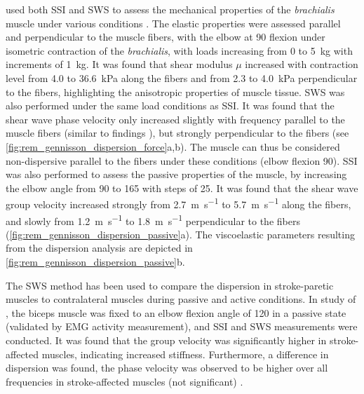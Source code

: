 \citeauthor{gennisson_viscoelastic_2010} used both SSI and SWS to assess the mechanical properties of the \textit{brachialis} muscle under various conditions \cite{gennisson_viscoelastic_2010}. The elastic properties were assessed parallel and perpendicular to the muscle fibers, with the elbow at \SI{90}{\deg} flexion under isometric contraction of the \textit{brachialis}, with loads increasing from 0 to \SI{5}{\kilogram} with increments of \SI{1}{\kilogram}. It was found that shear modulus $\mu$ increased with contraction level from 4.0 to \SI{36.6}{\kilo\pascal} along the fibers and from 2.3 to \SI{4.0}{\kilo\pascal} perpendicular to the fibers, highlighting the anisotropic properties of muscle tissue. SWS was also performed under the same load conditions as SSI. It was found that the shear wave phase velocity only increased slightly with frequency parallel to the muscle fibers (similar to findings \citet{deffieux_shear_2009}), but strongly perpendicular to the fibers (see \autoref{fig:rem_gennisson_dispersion_force}a,b). The muscle can thus be considered non-dispersive parallel to the fibers under these conditions (elbow flexion \SI{90}{\deg}). SSI was also performed to assess the passive properties of the muscle, by increasing the elbow angle from 90 to \SI{165}{\deg} with steps of \SI{25}{\deg}. It was found that the shear wave group velocity increased strongly from \SI{2.7}{\meter\per\second} to \SI{5.7}{\meter\per\second} along the fibers, and slowly from \SI{1.2}{\meter\per\second} to \SI{1.8}{\meter\per\second} perpendicular to the fibers (\autoref{fig:rem_gennisson_dispersion_passive}a). The viscoelastic parameters resulting from the dispersion analysis are depicted in \autoref{fig:rem_gennisson_dispersion_passive}b. %


The SWS method has been used to compare the dispersion in stroke-paretic muscles to contralateral muscles during passive \cite{rasool_altered_2016} and active \cite{saadat_frequency_2018} conditions. In study of \citet{rasool_altered_2016}, the biceps muscle was fixed to an elbow flexion angle of \SI{120}{\deg} in a passive state (validated by EMG activity measurement), and SSI and SWS measurements were conducted. It was found that the group velocity was significantly higher in stroke-affected muscles, indicating increased stiffness. Furthermore, a difference in dispersion was found, the phase velocity was observed to be higher over all frequencies in stroke-affected muscles (not significant) \cite{rasool_altered_2016}. 

